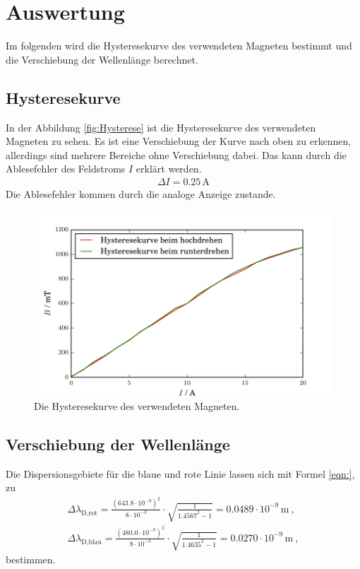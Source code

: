 \section{Auswertung}
\label{sec:Auswertung}
Im folgenden wird die Hysteresekurve des verwendeten Magneten bestimmt und die Verschiebung der Wellenlänge berechnet.

\subsection{Hysteresekurve}
In der Abbildung \eqref{fig:Hysterese} ist die Hysteresekurve des verwendeten Magneten zu sehen. Es ist eine Verschiebung der Kurve nach oben zu erkennen, allerdings sind mehrere Bereiche ohne Verschiebung dabei. Das kann durch die Ablesefehler des Feldstroms $I$ erklärt werden.
\begin{align}
  \Delta I = 0.25\, \text{A}
\end{align}
Die Ablesefehler kommen durch die analoge Anzeige zustande.

\begin{figure}
  \centering
  \includegraphics[width=\linewidth]{Bilder/Hysterese.pdf}
  \caption{Die Hysteresekurve des verwendeten Magneten.}
  \label{fig:Hysterese}
\end{figure}


\subsection{Verschiebung der Wellenlänge}
Die Dispersionsgebiete für die blaue und rote Linie lassen sich mit Formel \eqref{eqn:}, zu
\begin{align}
  \Delta\lambda_\text{D,rot} = \frac{(643.8\cdot 10^{-9})^2}{8\cdot 10^{-3}} \cdot \sqrt{\frac{1}{1.4567^2 - 1}} = 0.0489 \cdot 10^{-9}\,\text{m}\ , \\
  \Delta\lambda_\text{D,blau} = \frac{(480.0\cdot 10^{-9})^2}{8\cdot 10^{-3}} \cdot \sqrt{\frac{1}{1.4635^2 - 1}} = 0.0270 \cdot 10^{-9}\,\text{m}\ ,
\end{align}
bestimmen.



